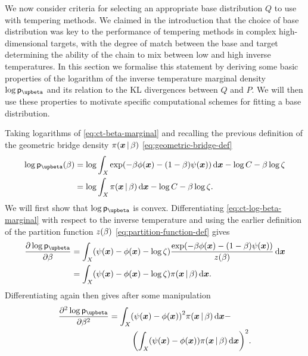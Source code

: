 We now consider criteria for selecting an appropriate base distribution $Q$ to use with tempering methods. We claimed in the introduction that the choice of base distribution was key to the performance of tempering methods in complex high-dimensional targets, with the degree of match between the base and target determining the ability of the chain to mix between low and high inverse temperatures. In this section we formalise this statement by deriving some basic properties of the logarithm of the inverse temperature marginal density $\log\pden{\upbeta}$ and its relation to the \ac{KL} divergences between $Q$ and $P$. We will then use these properties to motivate specific computational schemes for fitting a base distribution.

Taking logarithms of \eqref{eq:ct-beta-marginal} and recalling the previous definition of the geometric bridge density $\pi(\boldsymbol{x}\operatorname{|}\beta)$ \eqref{eq:geometric-bridge-def}
\begin{align} \nonumber
  \log\pden{\upbeta}(\beta) &=
  \log \int_{\set{X}} \exp\lpa - \beta\phi(\vct{x}) - (1-\beta)\psi(\vct{x})\rpa\,\dr\vct{x}
  - \log C - \beta \log \zeta
  \\ \label{eq:ct-log-beta-marginal}
  &= \log\int_{\set{X}}\pi(\vct{x}\gvn\beta)\,\dr\vct{x} - \log C - \beta\log\zeta.
\end{align}
We will first show that $\log\pden{\upbeta}$ is convex. Differentiating \eqref{eq:ct-log-beta-marginal} with respect to the inverse temperature and using the earlier definition of the partition function $z(\beta)$ \eqref{eq:partition-function-def} gives
\begin{align}\nonumber
  \pd{\log\pden{\upbeta}}{\beta} &=
  \int_{\set{X}} 
  \lpa \psi(\vct{x}) - \phi(\vct{x}) - \log\zeta \rpa
  \frac{\exp\lpa - \beta\phi(\vct{x}) - (1-\beta)\psi(\vct{x})\rpa}{\partfunc(\beta)}
  \,\dr\vct{x}\\
  &=\label{eq:ct-log-beta-marginal-deriv}
  \int_{\set{X}} 
  \lpa \psi(\vct{x}) - \phi(\vct{x}) - \log\zeta \rpa \pi(\vct{x}\gvn\beta)
  \,\dr\vct{x}.
\end{align}
Differentiating again then gives after some manipulation
\begin{equation}\label{eq:ct-log-beta-marginal-second-deriv}
\begin{split}
  \pd{^2\log\pden{\upbeta}}{\beta^2} &=
  \int_{\set{X}} \lpa \psi(\vct{x}) - \phi(\vct{x})\rpa^2 \pi(\vct{x}\gvn\beta)\,\dr\vct{x} -
  \\&\phantom{=}\qquad
  \lpa
    \int_{\set{X}} \lpa \psi(\vct{x}) - \phi(\vct{x})\rpa\pi(\vct{x}\gvn\beta)\,\dr\vct{x}
  \rpa^2.
\end{split}
\end{equation}
